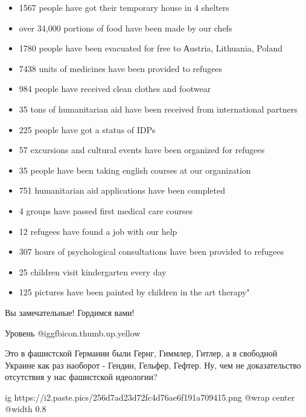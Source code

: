 \begin{itemize}
  \item 1567 people have got their temporary house in 4 shelters
  \item over 34,000 portions of food have been made by our chefs
  \item 1780 people have been evacuated for free to Аustria, Lithuania, Poland
  \item 7438 units of medicines have been provided to refugees
  \item 984 people have received clean clothes and footwear
  \item 35 tons of humanitarian aid have been received from international partners
  \item 225 people have got a status of IDPs
  \item 57 excursions and cultural events have been organized for refugees
  \item 35 people have been taking english courses at our organization
  \item 751 humanitarian aid applications have been completed
  \item 4 groups have passed first medical care courses
  \item 12 refugees have found a job with our help
  \item 307 hours of psychological consultations have been provided to refugees
  \item 25 children visit kindergarten every day
  \item 125 pictures have been painted by children in the art therapy"
\end{itemize}

\begin{itemize} %
Вы замечательные! Гордимся вами!

Уровень @igg{fbicon.thumb.up.yellow} 


Это в фашистской Германии были Гернг, Гиммлер, Гитлер, а в свободной Украине
как раз наоборот - Гендин, Гельфер, Гефтер. Ну, чем не доказательство
отсутствия у нас фашистской идеологии?

\end{itemize} %

\ifcmt
  ig https://i2.paste.pics/256d7ad23d72fc4d76ae6f191a709415.png
  @wrap center
  @width 0.8
\fi
